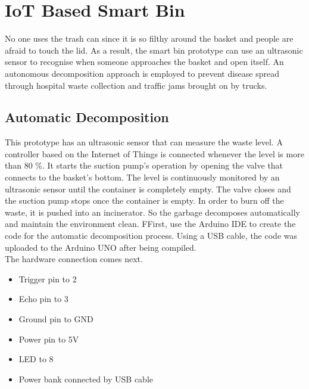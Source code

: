 \section{IoT Based Smart Bin}
No one uses the trash can since it is so filthy around the basket and people are afraid to touch the lid. As a result, the smart bin prototype can use an ultrasonic sensor to recognise when someone approaches the basket and open itself. An autonomous decomposition approach is employed to prevent disease spread through hospital waste collection and traffic jams brought on by trucks.
\subsection{Automatic Decomposition}
This prototype has an ultrasonic sensor that can measure the waste level. A controller based on the Internet of Things is connected whenever the level is more than 80 \%. It starts the suction pump's operation by opening the valve that connects to the basket's bottom.
The level is continuously monitored by an ultrasonic sensor until the container is completely empty. The valve closes and the suction pump stops once the container is empty. In order to burn off the waste, it is pushed into an incinerator. So the garbage decomposes automatically and maintain the environment clean.
FFirst, use the Arduino IDE to create the code for the automatic decomposition process.
Using a USB cable, the code was uploaded to the Arduino UNO after being compiled.\\
The hardware connection comes next.\\
\begin{itemize}
    \item Trigger pin to 2
    \item Echo pin to 3
    \item Ground pin to GND
    \item Power pin to 5V
    
\end{itemize}
\begin{itemize}
    \item LED to 8
\end{itemize}
\begin{itemize}
    \item Power bank connected by USB cable
\end{itemize}
